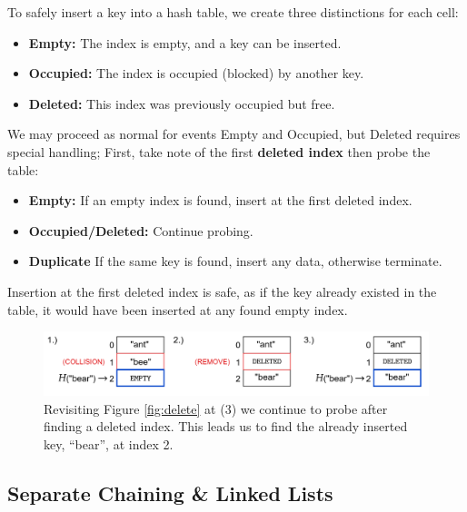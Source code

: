 \newpage 

\begin{theo}

    \label{thm:safe_insertion}
    
    To safely insert a key into a hash table, we create three distinctions for each cell:
    \begin{itemize}
        \item \textbf{Empty:} The index is empty, and a key can be inserted.
        \item \textbf{Occupied:} The index is occupied (blocked) by another key.
        \item \textbf{Deleted:} This index was previously occupied but free.
    \end{itemize}

    \noindent
    We may proceed as normal for events Empty and Occupied, but Deleted requires special handling;
    First, take note of the first \textbf{deleted index} then probe the table:
    \begin{itemize}
        \item \textbf{Empty:} If an empty index is found, insert at the first deleted index.
        \item \textbf{Occupied/Deleted:} Continue probing.
        \item \textbf{Duplicate} If the same key is found, insert any data, otherwise terminate.
    \end{itemize}

    \noindent
    Insertion at the first deleted index is safe, as if the key already existed in the table,
    it would have been inserted at any found empty index.
\end{theo}

\begin{figure}[ht!]
    \centering
    \includegraphics[width=\textwidth]{./Sections/hash/delete_2.png}
    \caption{Revisiting Figure \ref{fig:delete} at (3) we continue to probe after finding a deleted index.
    This leads us to find the already inserted key, ``bear'', at index 2.}
    \label{fig:delete_2}
\end{figure}

\subsection{Separate Chaining \& Linked Lists}


